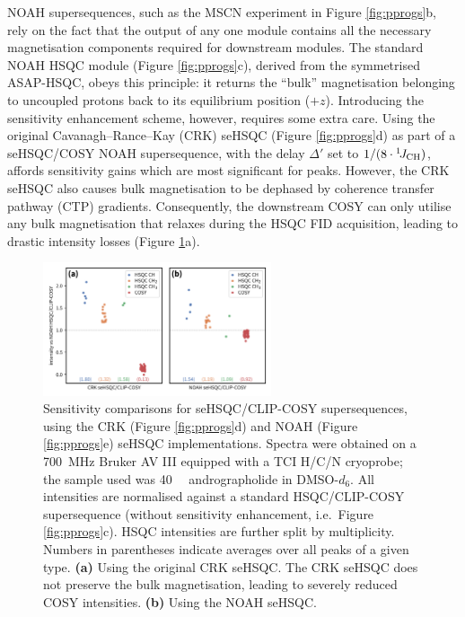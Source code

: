 \documentclass[11pt]{article}
\newcommand*{\onejch}{{}^{1}\!J_{\ce{CH}}}
\newcommand*{\figref}[1]{Figure \ref{fig:#1}}
\newcommand*{\andro}{Spectra were obtained on a \SI{700}{\MHz} Bruker AV III equipped with a TCI H/C/N cryoprobe; the sample used was \SI{40}{\milli\molar} andrographolide in DMSO-$d_6$.}
\begin{document}
NOAH supersequences, such as the MSCN experiment in \figref{pprogs}b, rely on the fact that the output of any one module contains all the necessary magnetisation components required for downstream modules.
The standard NOAH HSQC module (\figref{pprogs}c), derived from the symmetrised ASAP-HSQC,\autocite{asaphsqc} obeys this principle: it returns the ``bulk'' magnetisation belonging to uncoupled protons back to its equilibrium position ($+z$).
Introducing the sensitivity enhancement scheme, however, requires some extra care.
Using the original Cavanagh--Rance--Kay (CRK) seHSQC (\figref{pprogs}d) as part of a seHSQC/COSY NOAH supersequence, with the delay $\Delta'$ set to $1/(8 \cdot \onejch)$, affords sensitivity gains which are most significant for  peaks.\autocite{sehsqc_sens}
However, the CRK seHSQC also causes bulk magnetisation to be dephased by coherence transfer pathway (CTP) gradients.
Consequently, the downstream COSY can only utilise any bulk magnetisation that relaxes during the HSQC FID acquisition, leading to drastic intensity losses (\figref{spor_spv2}a).

\begin{figure}
    \centering
    \includegraphics[width=0.6\textwidth]{figures/spor_spv2_comp.png}
    \caption{
        Sensitivity comparisons for seHSQC/CLIP-COSY\autocite{Koos2016ACIE} supersequences, using the CRK (\figref{pprogs}d) and NOAH (\figref{pprogs}e) seHSQC implementations.
        \andro{}
        All intensities are normalised against a standard HSQC/CLIP-COSY supersequence (without sensitivity enhancement, i.e.\ \figref{pprogs}c).
        HSQC intensities are further split by multiplicity.
        Numbers in parentheses indicate averages over all peaks of a given type.
        \textbf{(a)} Using the original CRK seHSQC.
        The CRK seHSQC does not preserve the bulk magnetisation, leading to severely reduced COSY intensities.
        \textbf{(b)} Using the NOAH seHSQC.
    }
    \label{fig:spor_spv2}
\end{figure}
\end{document}

